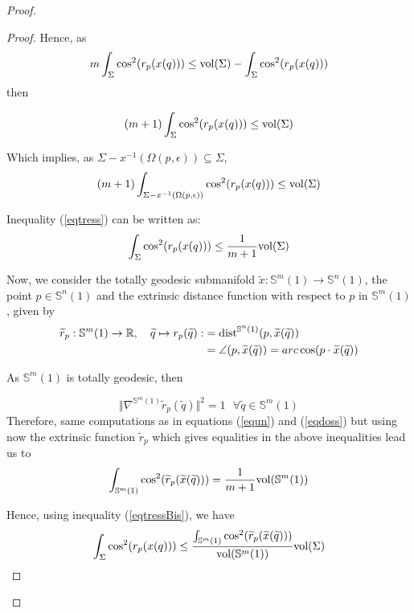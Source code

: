 \documentclass{amsart}
\theoremstyle{definition}
\theoremstyle{remark}
\newcommand{\ese}{\mathbb{S}}
\begin{document}
\begin{proof}
\begin{proof}
Hence, as 
$$m\int_\Sigma \cos^2(r_p(x(q)))\leq {\rm vol}(\Sigma)- \int_\Sigma \cos^2(r_p(x(q)))$$ \noindent then

\begin{equation}\label{eqtress}
(m+1)\int_\Sigma \cos^2(r_p(x(q)))\leq {\rm vol}(\Sigma)
\end{equation}

Which implies, as  $\Sigma-x^{-1}(\Omega(p,\epsilon)) \subseteq \Sigma$,
\begin{equation}\label{eqcu}
(m+1)\int_{\Sigma-x^{-1}(\Omega(p,\epsilon))} \cos^2(r_p(x(q)))\leq {\rm vol}(\Sigma)
\end{equation}


Inequality (\ref{eqtress}) can be written as:
\begin{equation}\label{eqtressBis}
\int_\Sigma \cos^2(r_p(x(q))) \leq \frac{1}{m+1} {\rm vol}(\Sigma)
\end{equation}

Now, we consider the totally geodesic submanifold $\widetilde{x}: \mathbb{S}^m(1) \rightarrow \mathbb{S}^n(1)$, the point $p \in \ese^n(1)$ and the extrinsic distance function with respect to $p$ in $\ese^m(1)$, given by
$$
\begin{aligned}
\widetilde{r}_p:\ese^m(1) \to \mathbb{R}, \quad \widetilde{q}\mapsto r_p(\widetilde{q}):&={\rm dist}^{\mathbb{S}^n(1)}(p,\widetilde{x}(\widetilde{q}))\\&=\angle{(p,\widetilde{x}(\widetilde{q}))}=arc\cos(p\cdot \widetilde{x}(\widetilde{q}))
\end{aligned}
$$


As $\ese^m(1)$ is totally geodesic, then

$$\Vert \nabla^{\ese^m(1)}\widetilde{r}_p(\widetilde{q})\Vert^2=1\,\,\,\,\forall \widetilde{q} \in \ese^m(1)$$
\noindent Therefore, same computations as in equations (\ref{equn}) and (\ref{eqdoss}) but using now the extrinsic function $\widetilde{r}_p$ which gives equalities in the above inequalities lead us to
\begin{equation}\label{eqcinc}
\int_{\mathbb{S}^m(1)} \cos^2(\widetilde{r}_p(\widetilde{x}(\widetilde{q}))) = \frac{1}{m+1} {\rm vol}(\mathbb{S}^m(1))
\end{equation}

Hence, using inequality (\ref{eqtressBis}), we have 
\begin{equation}\label{eqsis}
\int_\Sigma \cos^2(r_p(x(q))) \leq \frac{\int_{\mathbb{S}^m(1)} \cos^2(\widetilde{r}_p(\widetilde{x}(\widetilde{q})))}{{\rm vol}(\mathbb{S}^m(1))} {\rm vol}(\Sigma)
\end{equation}


\end{proof}
\end{proof}
\end{document}
